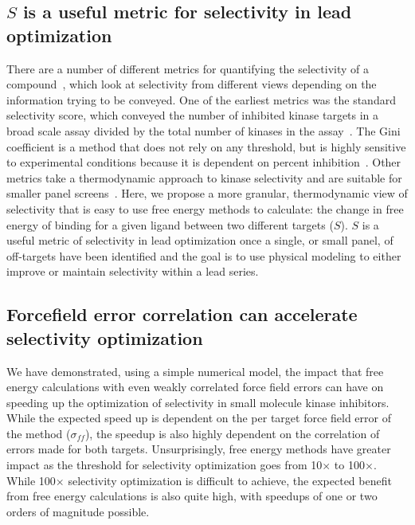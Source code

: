 \documentclass[phd,tocprelim]{cornell}
\begin{document}
\subsection{$S$ is a useful metric for selectivity in lead optimization}
There are a number of different metrics for quantifying the selectivity of a compound~\citep{Bosc:2017gs}, which look at selectivity from different views depending on the information trying to be conveyed. 
One of the earliest metrics was the standard selectivity score, which conveyed the number of inhibited kinase targets in a broad scale assay divided by the total number of kinases in the assay~\citep{Davis2011-dz}. 
The Gini coefficient is a method that does not rely on any threshold, but is highly sensitive to experimental conditions because it is dependent on percent inhibition~\citep{Graczyk:2007bm}. Other metrics take a thermodynamic approach to kinase selectivity and are suitable for smaller panel screens~\citep{DuongLy:2016iha,Uitdehaag:2011ea}. Here, we propose a more granular, thermodynamic  view of selectivity that is easy to use free energy methods to calculate: the change in free energy of binding for a given ligand between two different targets ($S$). 
$S$ is a useful metric of selectivity in lead optimization once a single, or small panel, of off-targets have been identified and the goal is to use physical modeling to either improve or maintain selectivity within a lead series. 

\subsection{Forcefield error correlation can accelerate selectivity optimization}
We have demonstrated, using a simple numerical model, the impact that free energy calculations with even weakly correlated force field errors can have on speeding up the optimization of selectivity in small molecule kinase inhibitors. 
While the expected speed up is dependent on the per target force field error of the method ($\sigma_{ff}$), the speedup is also highly dependent on the correlation of errors made for both targets. 
Unsurprisingly, free energy methods have greater impact as the threshold for selectivity optimization goes from 10$\times$ to 100$\times$. 
While 100$\times$ selectivity optimization is difficult to achieve, the expected benefit from free energy calculations is also quite high, with speedups of one or two orders of magnitude possible. 
\end{document}
